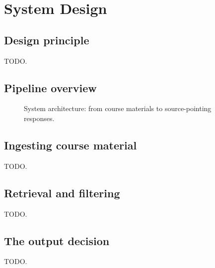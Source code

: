 \section{System Design}
\label{sec:system}


\subsection{Design principle}
TODO.

\subsection{Pipeline overview}
\begin{figure}[H]
  \centering
  \caption{System architecture: from course materials to source-pointing responses.}
  \label{fig:arch}
\end{figure}

\subsection{Ingesting course material}
TODO.

\subsection{Retrieval and filtering}
TODO.

\subsection{The output decision}
TODO.
